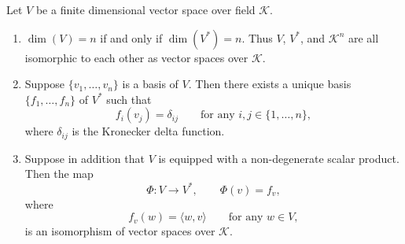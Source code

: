     \begin{lemmaenv}
    Let $V$ be a finite dimensional vector space over field $\mathcal{K}$.
    \begin{enumerate}
        \item $\dim(V)=n$ if and only if $\dim(V^*)=n$. Thus $V$, $V^*$, and $\mathcal{K}^n$ are all isomorphic to each other as vector spaces over $\mathcal{K}$.

        \item Suppose $\{v_1,\dots,v_n\}$ is a basis of $V$. Then there exists a unique basis $\{f_1,\dots,f_n\}$ of $V^*$ such that
        \[
        f_i(v_j)=\delta_{ij}
        \qquad
        \text{for any } i,j\in\{1,\dots,n\},
        \]
        where $\delta_{ij}$ is the Kronecker delta function.

        \item Suppose in addition that $V$ is equipped with a non-degenerate scalar product. Then the map
        \[
        \Phi:V\to V^*,\qquad \Phi(v)=f_v,
        \]
        where
        \[
        f_v(w)=\langle w,v\rangle
        \qquad
        \text{for any } w\in V,
        \]
        is an isomorphism of vector spaces over $\mathcal{K}$.
    \end{enumerate}
    \end{lemmaenv}

